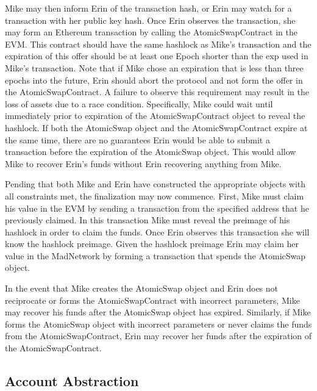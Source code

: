 Mike may then inform Erin of the transaction hash, or Erin may watch
for a transaction with her public key hash.
Once Erin observes the transaction, she may form an Ethereum
transaction by calling the AtomicSwapContract in the EVM.
This contract should have the same hashlock as Mike's transaction and
the expiration of this offer should be at least one Epoch shorter than
the exp used in Mike's transaction.
Note that if Mike chose an expiration that is less than three epochs
into the future, Erin should abort the protocol and not form the offer
in the AtomicSwapContract.
A failure to observe this requirement may result in the loss of assets
due to a race condition.
Specifically, Mike could wait until immediately prior to expiration of
the AtomicSwapContract object to reveal the hashlock.
If both the AtomicSwap object and the AtomicSwapContract expire at the
same time, there are no guarantees Erin would be able to submit a
transaction before the expiration of the AtomicSwap object.
This would allow Mike to recover Erin's funds without Erin recovering
anything from Mike.

Pending that both Mike and Erin have constructed the appropriate
objects with all constraints met, the finalization may now commence.
First, Mike must claim his value in the EVM by sending a transaction
from the specified address that he previously claimed.
In this transaction Mike must reveal the preimage of his hashlock in
order to claim the funds.
Once Erin observes this transaction she will know the hashlock preimage.
Given the hashlock preimage Erin may claim her value in the MadNetwork
by forming a transaction that spends the AtomicSwap object.

In the event that Mike creates the AtomicSwap object and Erin does not
reciprocate or forms the AtomicSwapContract with incorrect parameters,
Mike may recover his funds after the AtomicSwap object has expired.
Similarly, if Mike forms the AtomicSwap object with incorrect
parameters or never claims the funds from the AtomicSwapContract, Erin
may recover her funds after the expiration of the AtomicSwapContract.


\subsection{Account Abstraction}

